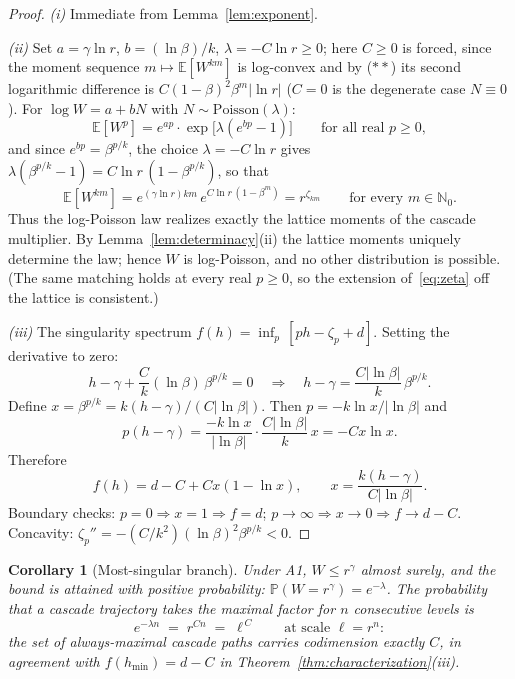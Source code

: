 \documentclass[pdflatex,sn-mathphys-num]{sn-jnl}
\theoremstyle{thmstyleone}
\newtheorem{corollary}[theorem]{Corollary}
\theoremstyle{thmstyletwo}
\theoremstyle{thmstylethree}
\begin{document}
\begin{proof}
\textit{(i)} Immediate from Lemma~\ref{lem:exponent}.

\textit{(ii)} Set $a = \gamma\ln r$, $b = (\ln\beta)/k$, $\lambda =
-C\ln r \ge 0$; here $C \ge 0$ is forced, since the moment sequence
$m \mapsto \mathbb{E}[W^{km}]$ is log-convex and by \textup{($**$)}
its second logarithmic difference is $C(1-\beta)^2\beta^m|\ln r|$
($C = 0$ is the degenerate case $N \equiv 0$).  For $\log W = a + bN$ with $N \sim
\mathrm{Poisson}(\lambda)$:
\[
  \mathbb{E}[W^p] = e^{ap} \cdot \exp\bigl[\lambda(e^{bp} - 1)\bigr]
  \qquad\text{for all real } p \ge 0,
\]
and since $e^{bp} = \beta^{p/k}$, the choice $\lambda = -C\ln r$
gives $\lambda(\beta^{p/k}-1) = C\ln r\,(1-\beta^{p/k})$, so that
\[
  \mathbb{E}[W^{km}]
  = e^{(\gamma\ln r) km}\, e^{C\ln r\,(1-\beta^{m})}
  = r^{\zeta_{km}}
  \qquad\text{for every } m \in \mathbb{N}_0 .
\]
Thus the log-Poisson law realizes exactly the lattice moments of the
cascade multiplier.  By Lemma~\ref{lem:determinacy}(ii) the lattice
moments uniquely determine the law; hence $W$ is log-Poisson, and no
other distribution is possible.  (The same matching holds at every
real $p \ge 0$, so the extension of~\eqref{eq:zeta} off the lattice
is consistent.)

\textit{(iii)}  The singularity spectrum $f(h) = \inf_p\,[ph -
\zeta_p + d]$.  Setting the derivative to zero:
\[
  h - \gamma + \frac{C}{k}(\ln\beta)\,\beta^{p/k} = 0
  \quad\Longrightarrow\quad
  h - \gamma = \frac{C|\ln\beta|}{k}\,\beta^{p/k}.
\]
Define $x = \beta^{p/k} = k(h-\gamma)/(C|\ln\beta|)$.  Then $p =
-k\ln x / |\ln\beta|$ and
\[
  p(h - \gamma) = \frac{-k\ln x}{|\ln\beta|}
    \cdot \frac{C|\ln\beta|}{k}\,x = -Cx\ln x.
\]
Therefore
\[
  f(h) = d - C + Cx(1 - \ln x), \qquad
  x = \frac{k(h-\gamma)}{C|\ln\beta|}.
\]
Boundary checks: $p = 0 \Rightarrow x = 1 \Rightarrow f = d$; $p \to
\infty \Rightarrow x \to 0 \Rightarrow f \to d - C$.  Concavity:
$\zeta_p'' = -(C/k^2)(\ln\beta)^2\beta^{p/k} < 0$.
\end{proof}

\begin{corollary}[Most-singular branch]\label{cor:branch}
Under A1, $W \le r^\gamma$ almost surely, and the bound is attained
with positive probability: $\mathbb{P}(W = r^\gamma) = e^{-\lambda}$.
The probability that a cascade trajectory takes the maximal factor
for $n$ consecutive levels is
\[
  e^{-\lambda n} \;=\; r^{Cn} \;=\; \ell^{\,C}
  \qquad\text{at scale } \ell = r^n :
\]
the set of always-maximal cascade paths carries codimension exactly
$C$, in agreement with $f(h_{\min}) = d - C$ in
Theorem~\textup{\ref{thm:characterization}(iii)}.
\end{corollary}
\end{document}
